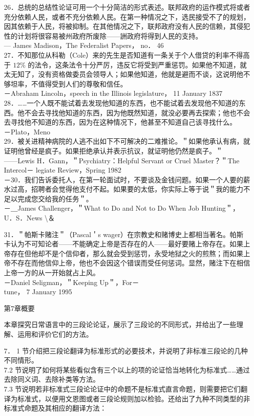 26．总统的总结性论证可用一个十分简洁的形式表述。联邦政府的运作模式将或者充分依赖人民，或者不充分依赖人民。在第一种情况之下，选民接受不了的规划，因其依赖于人民，将被抑制。在其他情况之下，联邦政府没有人民的信赖，其侵犯性的计划将很容易被州政府所废除——詶政府将得到人民的支持。\\
— James Madison，The Federalist Papers， no． 46\\
27．不知那位从科勒（Cole）来的先生是否知道有一条关于个人借贷的利率不得高于 $12 \%$ 的法令，这条法令十分严厉，违反它将受到严重惩罚。如果他不知道，就太无知了，没有资格做委员会领导人；如果他知道，他就是避而不谈，这说明他不够坦率，不值得受到人们的尊敬和信任。\\
－Abraham Lincoln，speech in the Illinois legislature， 11 January 1837\\
28．……一个人既不能试着去发现他知道的东西，也不能试着去发现他不知道的东西。他不会去寻找他知道的东西，因为他既然知道，就没必要再去探索；他也不会去寻找他不知道的东西，因为在这种情况下，他甚至不知道自己该寻找什么。\\
－Plato，Meno\\
29．被关进精神病院的人逃不出如下不可解决的二难推论。＂如果他承认有病，就证明他曾经是疯子。如果拒绝承认并表示抗议，就证明他仍然是疯子。＂\\
——Lewis H．Gann，＂Psychiatry：Helpful Servant or Cruel Master？＂The Intercol－ legiate Review，Spring 1982\\
－30．我们告诉委托人，在第一轮面试时，不要谈及金钱问题。如果一个人要的薪水过高，招聘者会觉得他支付不起。如果要的太低，你实际上等于说＂我的能力不足以完成您交给我的任务＂。\\
－＿James Challenger，＂What to Do and Not to Do When Job Hunting＂，U．S．News \textbackslash ＆

31．＂帕斯卡赌注＂（Pascal＇s wager）在宗教史和赌博史上都相当著名。帕斯卡认为不可知论者——不能确定上帝是否存在的人——最好要赌上帝存在。如果上帝存在但他却不是个信仰者，那么就会受到惩罚，永受地狱之火的煎熬；而如果上帝不存在而他信仰上帝，他也不会因这个错误而受任何惩词。显然，赌注下在相信上帝一方的从一开始就占上风。\\
－Daniel Seligman，＂Keeping Up＂，For－\\
tune， 7 January 1995

第7章概要

本章探究日常语言中的三段论论证，展示了三段论的不同形式，并给出了一些理解、运用和评价它们的方法。

7． 1 节介绍把三段论翻译为标准形式的必要技术，并说明了非标准三段论的几种不同情形。\\
7.2 节说明了如何将某些看似含有三个以上的项的论证恰当地转化为标准式……通过去除同义词、去除补类等方法。\\
7.3 节说明若非标准式三段论论证中的命题不是标准式直言命题，则需要把它们翻译为标准式，以便用文恩图或者三段论规则加以检验。还给出了九种不同类型的非标准式命题及其相应的翻译方法：

